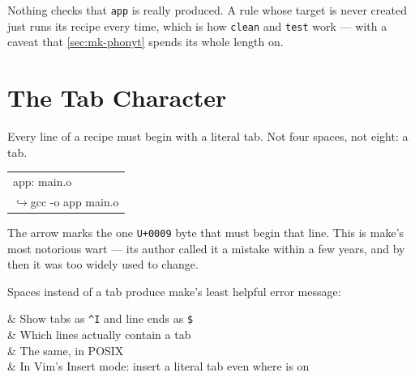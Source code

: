 \begin{note}
	Nothing checks that \texttt{app} is really produced. A rule whose target is
	never created just runs its recipe every time, which is how \texttt{clean} and
	\texttt{test} work --- with a caveat that \autoref{sec:mk-phonyt} spends its
	whole length on.
\end{note}

\section{The Tab Character}\label{sec:mk-tab}

Every line of a recipe must begin with a literal tab. Not four spaces, not
eight: a tab.

\begin{center}
	\ttfamily
	\begin{tabular}{@{}l@{}}
		app: main.o                                                        \\
		{\color{WildStrawberry}\ensuremath{\hookrightarrow}}\quad gcc -o app main.o \\
	\end{tabular}
\end{center}

\begin{note}
	The arrow marks the one \texttt{U+0009} byte that must begin that line. This
	is make's most notorious wart --- its author called it a mistake within a few
	years, and by then it was too widely used to change.
\end{note}

Spaces instead of a tab produce make's least helpful error message:


\begin{keys}[0.30]
	       & Show tabs as \texttt{\textasciicircum{}I} and line ends as \texttt{\$} \\
	 & Which lines actually contain a tab      \\
	   & The same, in POSIX                                    \\
	      & In Vim's Insert mode: insert a literal tab even where  is on \\
\end{keys}

